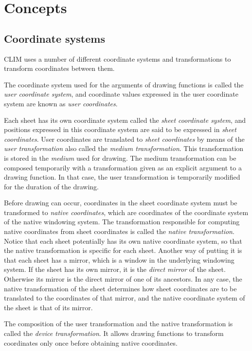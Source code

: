 \chapter{Concepts}

\section{Coordinate systems}

CLIM uses a number of different coordinate systems and transformations
to transform coordinates between them.

The coordinate system used for the arguments of drawing functions is
called the \emph{user coordinate system},
and coordinate values expressed in the user coordinate system are known
as \emph{user coordinates}.

Each sheet has its own coordinate system called the \emph{sheet
coordinate system},
 and positions expressed in this coordinate system are said to be
expressed in \emph{sheet coordinates}.
  User coordinates are translated to \emph{sheet coordinates} by means
of the \emph{user transformation} also called the \emph{medium
transformation}.  This transformation is stored in the \emph{medium}
used for drawing.  The medium transformation can be composed temporarily
with a transformation given as an explicit argument to a drawing
function.  In that case, the user transformation is temporarily modified
for the duration of the drawing.

Before drawing can occur, coordinates in the sheet coordinate system
must be transformed to \emph{native coordinates}, which are coordinates
of the coordinate system of the native windowing system.  The
transformation responsible for computing native coordinates from sheet
coordinates is called the \emph{native transformation}.  Notice that
each sheet potentially has its own native coordinate system, so that the
native transformation is specific for each sheet.  Another way of
putting it is that each sheet has a mirror, which is a window in the
underlying windowing system.  If the sheet has its own mirror, it is the
\emph{direct mirror} of the sheet.  Otherwise its mirror is the direct
mirror of one of its ancestors.  In any case, the native transformation
of the sheet determines how sheet coordinates are to be translated to
the coordinates of that mirror, and the native coordinate system of the
sheet is that of its mirror.

The composition of the user transformation and the native transformation
is called the \emph{device transformation}.  It allows drawing
functions to transform coordinates only once before obtaining native
coordinates.

